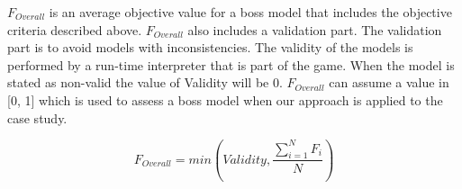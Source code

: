 $F_{Overall}$ is an average objective value for a boss model that includes the objective criteria described above. $F_{Overall}$ also includes a validation part. The validation part is to avoid models with inconsistencies. The validity of the models is performed by a run-time interpreter that is part of the game. When the model is stated as non-valid the value of Validity will be 0. $F_{Overall}$ can assume a value in [0, 1] which is used to assess a boss model when our \ApproachName{} approach is applied to the \CaseStudy{} case study.

\begin{equation}
F_{Overall} = min \left ( Validity, \frac{\sum\limits_{i=1}^{N}F_{i}}{N} \right )
\end{equation}





